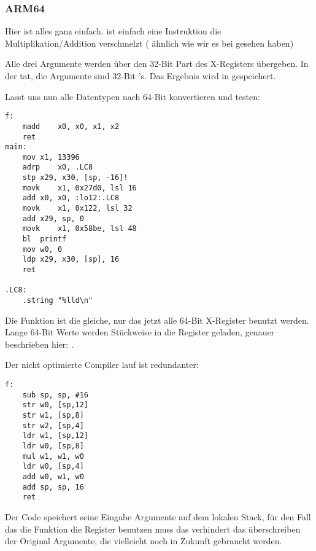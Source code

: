 \subsubsection{ARM64}



Hier ist alles ganz einfach. 
 ist einfach eine Instruktion die Multiplikation/Addition verschmelzt ( ähnlich wie wir es bei 
gesehen haben)

Alle drei Argumente werden über den 32-Bit Part des X-Registers übergeben.
In der tat, die Argumente sind 32-Bit 's.
Das Ergebnis wird in  gespeichert.



Lasst uns nun alle Datentypen nach 64-Bit  konvertieren und testen:



\begin{lstlisting}
f:
	madd	x0, x0, x1, x2
	ret
main:
	mov	x1, 13396
	adrp	x0, .LC8
	stp	x29, x30, [sp, -16]!
	movk	x1, 0x27d0, lsl 16
	add	x0, x0, :lo12:.LC8
	movk	x1, 0x122, lsl 32
	add	x29, sp, 0
	movk	x1, 0x58be, lsl 48
	bl	printf
	mov	w0, 0
	ldp	x29, x30, [sp], 16
	ret

.LC8:
	.string	"%lld\n"
\end{lstlisting}

Die \ttf{} Funktion ist die gleiche, nur das jetzt alle 64-Bit X-Register benutzt werden.
Lange 64-Bit Werte werden Stückweise in die Register geladen, genauer beschrieben hier: .


Der nicht optimierte Compiler lauf ist redundanter:

\begin{lstlisting}
f:
	sub	sp, sp, #16
	str	w0, [sp,12]
	str	w1, [sp,8]
	str	w2, [sp,4]
	ldr	w1, [sp,12]
	ldr	w0, [sp,8]
	mul	w1, w1, w0
	ldr	w0, [sp,4]
	add	w0, w1, w0
	add	sp, sp, 16
	ret
\end{lstlisting}

Der Code speichert seine Eingabe Argumente auf dem lokalen Stack,
für den Fall das die Funktion die  Register benutzen muss
das verhindert das überschreiben der Original Argumente, die vielleicht
noch in Zukunft gebraucht werden.

